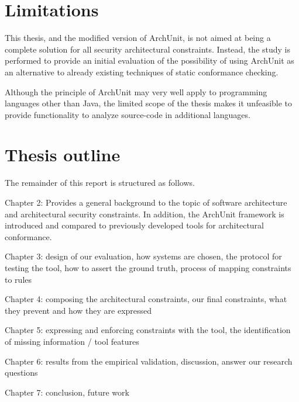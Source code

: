 \section{Limitations}
\label{sec:limitations}

This thesis, and the modified version of ArchUnit, is not aimed at being a complete solution for all security architectural constraints. Instead, the study is performed to provide an initial evaluation of the possibility of using ArchUnit as an alternative to already existing techniques of static conformance checking. 

Although the principle of ArchUnit may very well apply to programming languages other than Java, the limited scope of the thesis makes it unfeasible to provide functionality to analyze source-code in additional languages.

\section{Thesis outline}

The remainder of this report is structured as follows.

Chapter 2: Provides a general background to the topic of software architecture and architectural security constraints. In addition, the ArchUnit framework is introduced and compared to previously developed tools for architectural conformance.  

Chapter 3:
design of our evaluation,
how systems are chosen,
the protocol for testing the tool,
how to assert the ground truth,
process of mapping constraints to rules

Chapter 4:
composing the architectural constraints,
our final constraints, what they prevent and how they are expressed

Chapter 5:
expressing and enforcing constraints with the tool,
the identification of missing information / tool features

Chapter 6:
results from the empirical validation,
discussion,
answer our research questions

Chapter 7:
conclusion,
future work